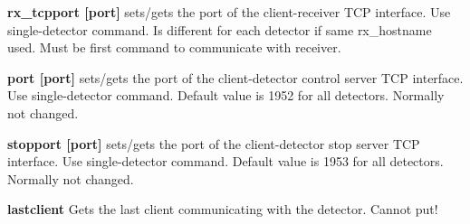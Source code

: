 \begin{DoxyItemize}
\item {\bfseries rx\_\-tcpport \mbox{[}port\mbox{]}} sets/gets the port of the client-\/receiver TCP interface. Use single-\/detector command. Is different for each detector if same {\ttfamily rx\_\-hostname} used. Must be first command to communicate with receiver.
\end{DoxyItemize}


\begin{DoxyItemize}
\item {\bfseries port \mbox{[}port\mbox{]}} sets/gets the port of the client-\/detector control server TCP interface. Use single-\/detector command. Default value is 1952 for all detectors. Normally not changed.
\end{DoxyItemize}


\begin{DoxyItemize}
\item {\bfseries stopport \mbox{[}port\mbox{]}} sets/gets the port of the client-\/detector stop server TCP interface. Use single-\/detector command. Default value is 1953 for all detectors. Normally not changed.
\end{DoxyItemize}


\begin{DoxyItemize}
\item {\bfseries lastclient } Gets the last client communicating with the detector. Cannot put! 
\end{DoxyItemize}
